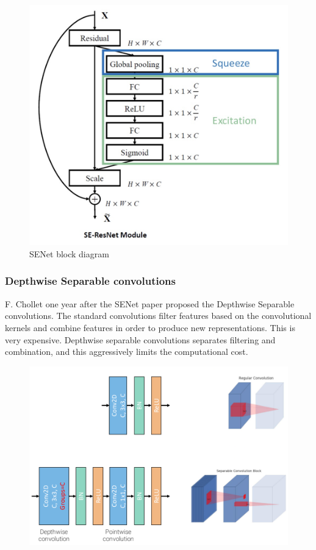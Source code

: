\begin{figure}[htbp]
  \centering
  \includegraphics[width=0.8\linewidth]{./img/senet.jpg}
  \caption{SENet block diagram}
\end{figure}

\subsubsection{Depthwise Separable convolutions}
F. Chollet one year after the SENet paper proposed the Depthwise Separable convolutions.
The standard convolutions filter features based on the convolutional kernels and combine features in order to produce new representations.
This is very expensive.
Depthwise separable convolutions separates filtering and combination, and this aggressively limits the computational cost.

\begin{figure}[htbp]
  \centering
  \includegraphics[width=0.8\linewidth]{./img/separable_convolution.png}
\end{figure}

